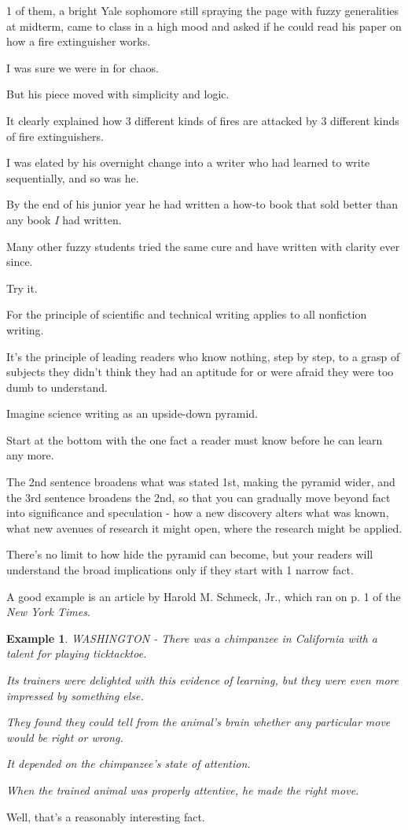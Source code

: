 \documentclass{book}
\numberwithin{equation}{section}
\newtheorem{example}{Example}[chapter]
\begin{document}
1 of them, a bright Yale sophomore still spraying the page with fuzzy generalities at midterm, came to class in a high mood and asked if he could read his paper on how a fire extinguisher works.

I was sure we were in for chaos.

But his piece moved with simplicity and logic.

It clearly explained how 3 different kinds of fires are attacked by 3 different kinds of fire extinguishers.

I was elated by his overnight change into a writer who had learned to write sequentially, and so was he.

By the end of his junior year he had written a how-to book that sold better than any book \textit{I} had written.

%
Many other fuzzy students tried the same cure and have written with clarity ever since.

Try it.

For the principle of scientific and technical writing applies to all nonfiction writing.

It's the principle of leading readers who know nothing, step by step, to a grasp of subjects they didn't think they had an aptitude for or were afraid they were too dumb to understand.

%
Imagine science writing as an upside-down pyramid.

Start at the bottom with the one fact a reader must know before he can learn any more.

The 2nd sentence broadens what was stated 1st, making the pyramid wider, and the 3rd sentence broadens the 2nd, so that you can gradually move beyond fact into significance and speculation - how a new discovery alters what was known, what new avenues of research it might open, where the research might be applied.

There's no limit to how hide the pyramid can become, but your readers will understand the broad implications only if they start with 1 narrow fact.

%
A good example is an article by Harold M. Schmeck, Jr., which ran on p. 1 of the \textit{New York Times}.

\begin{example}
    WASHINGTON - There was a chimpanzee in California with a talent for playing ticktacktoe.
    
    Its trainers were delighted with this evidence of learning, but they were even more impressed by something else.
    
    They found they could tell from the animal's brain whether any particular move would be right or wrong.
    
    It depended on the chimpanzee's state of attention.
    
    When the trained animal was properly attentive, he made the right move.
\end{example}
Well, that's a reasonably interesting fact.
\end{document}
